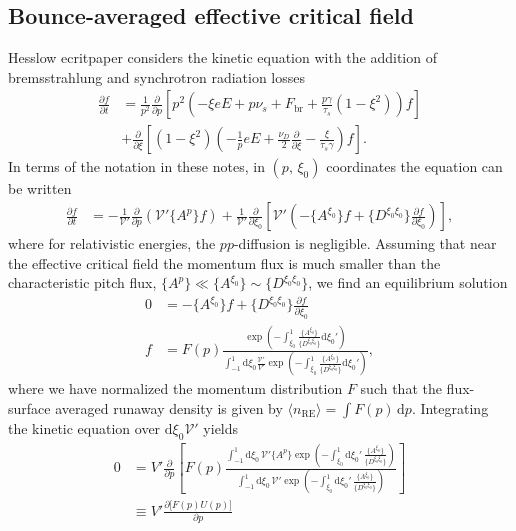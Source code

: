 \documentclass[11pt,a4paper]{article}
\newcommand{\rd}{\ensuremath{\mathrm{d}}}
\newcommand{\sub}[1]{\ensuremath{_{\text{#1}}}}
\begin{document}
\subsection{Bounce-averaged effective critical field}
Hesslow ecritpaper considers the kinetic equation with the addition of bremsstrahlung and synchrotron radiation losses
\begin{align}
\frac{\partial f}{\partial t} &= \frac{1}{p^2}\frac{\partial}{\partial p}\left[ p^2\left(-\xi eE + p\nu_s + F\sub{br}+\frac{p\gamma}{\tau_s}(1-\xi^2)\right)f\right] \nonumber \\
&+\frac{\partial}{\partial \xi}\left[ (1-\xi^2)\left( -\frac{1}{p}eE + \frac{\nu_D}{2}\frac{\partial}{\partial \xi} - \frac{\xi}{\tau_s \gamma} \right)f\right].
\end{align}
In terms of the notation in these notes, in $(p,\,\xi_0)$ coordinates the equation can be written
\begin{align}
\frac{\partial f}{\partial t} &= -\frac{1}{\mathcal{V}'}\frac{\partial}{\partial p}\left(\mathcal{V'} \{A^p\}f\right) + \frac{1}{\mathcal{V}'}\frac{\partial}{\partial \xi_0}\left[\mathcal{V'}\left( -\{A^{\xi_0}\}f + \{D^{\xi_0\xi_0}\} \frac{\partial f}{\partial \xi_0}\right)\right],
\end{align}
where for relativistic energies, the $pp$-diffusion is negligible. Assuming that near the effective critical field the momentum flux is much smaller than the characteristic pitch flux, $\{A^p\} \ll \{A^{\xi_ 0}\} \sim \{D^{\xi_0 \xi_0}\}$, we find an equilibrium solution
\begin{align}
0 &= -\{A^{\xi_0}\}f + \{D^{\xi_0\xi_0}\} \frac{\partial f}{\partial \xi_0} \nonumber \\
f &= F(p) \frac{\exp\left( -\int_{\xi_0}^1 \frac{\{A^{\xi_0}\}}{\{D^{\xi_0\xi_0}\}} \rd \xi_0' \right)}{\int_{-1}^1 \rd \xi_0 \frac{\mathcal{V}'}{V'}\exp\left( -\int_{\xi_0}^1 \frac{\{A^{\xi_0}\}}{\{D^{\xi_0\xi_0}\}} \rd \xi_0' \right) },
\end{align}
where we have normalized the momentum distribution $F$ such that the flux-surface averaged runaway density is given by $\langle n\sub{RE} \rangle = \int F(p) \,\rd p$.
Integrating the kinetic equation over $\rd \xi_0 \mathcal{V'}$ yields
\begin{align}
0 &= V' \frac{\partial}{\partial p} \left[ F(p)  \frac{\int_{-1}^1\rd \xi_0 \, \mathcal{V}'  \{A^p\} \exp\left( -\int_{\xi_0}^1\rd \xi_0' \,\frac{\{A^{\xi_0}\}}{\{D^{\xi_0\xi_0}\}} \right)}{\int_{-1}^1\rd \xi_0 \, \mathcal{V}' \exp\left( -\int_{\xi_0}^1\rd \xi_0' \,\frac{\{A^{\xi_0}\}}{\{D^{\xi_0\xi_0}\}} \right)}\right] \nonumber \\
&\equiv V' \frac{\partial \bigl[ F(p) U(p) \bigr]}{\partial p} 
\end{align}
\end{document}
